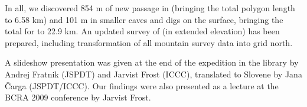 


In all, we discovered 854 m of new passage in  (bringing
the total polygon length to 6.58 km) and 101 m in smaller caves and digs
on the surface, bringing the total for  to 22.9 km. An updated
survey of  (in extended elevation) has been prepared,
including transformation of all mountain survey data into grid north.

A slideshow presentation was given
at the end of the expedition in the  library by Andrej Fratnik
(JSPDT) and Jarvist Frost (ICCC), translated to Slovene by Jana Čarga
(JSPDT/ICCC). Our findings were also presented as a lecture at the BCRA
2009 conference by Jarvist Frost.